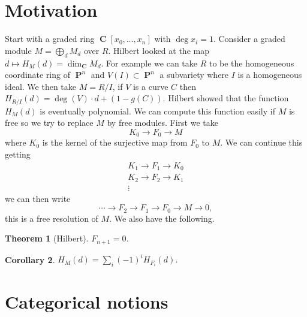 \documentclass[10pt,]{book}
\theoremstyle{plain}
\newtheorem{theorem}{Theorem}[section]
\newtheorem{corollary}[theorem]{Corollary}
\theoremstyle{definition}
\numberwithin{equation}{section}
\DeclareMathOperator{\CC}{\mathbf{C}}
\DeclareMathOperator{\PP}{\mathbf{P}}
\begin{document}
\section[Motivation]{Motivation}\label{sec-motivation}
Start with a graded ring \(\CC[x_0,\ldots,x_n]\) with \(\deg x_i = 1\).
          Consider a graded module \(M = \bigoplus_d M_d\) over \(R\).
          Hilbert looked at the map \(d\mapsto H_M (d)= \dim_{\CC} M_d\).
          For example we can take \(R\) to be the homogeneous coordinate ring of \(\PP^n\) and \(V(I)\subset \PP^n\) a subvariety where \(I\) is a homogeneous ideal.
          We then take \(M = R/I\), if \(V\) is a curve \(C\) then \(H_{R/I}(d) = \deg(V)\cdot d + (1 -g(C))\).
          Hilbert showed that the function \(H_M(d)\) is eventually polynomial.
          We can compute this function easily if \(M\) is free so we try to replace \(M\) by free modules.
          First we take
          \[K_0\to F_0 \to M\]
          where \(K_0\) is the kernel of the surjective map from \(F_0\) to \(M\).
          We can continue this getting
          \begin{gather*}
K_1\to F_1 \to K_0\\
K_2\to F_2 \to K_1\\
\vdots
\end{gather*}
          we can then write
          \[\cdots \to F_2\to F_1\to F_0 \to M \to 0,\]
          this is a free resolution of \(M\).
          We also have the following.
\begin{theorem}[Hilbert]\label{theorem-1}
\(F_{n+1} = 0\).\end{theorem}
\begin{corollary}\label{corollary-1}
\(H_M(d) = \sum_i (-1)^i H_{F_i}(d)\).\end{corollary}
\typeout{************************************************}
\typeout{************************************************}
\section[Categorical notions]{Categorical notions}\label{sec-cats}
\typeout{************************************************}
\typeout{************************************************}
\end{document}

